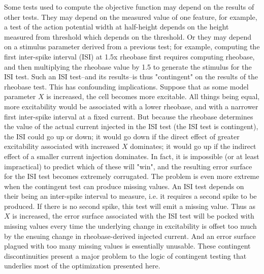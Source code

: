 Some tests used to compute the objective function may depend on the results of other tests.
They may depend on the measured value of one feature, for example, a test of the action potential width at half-height depends on the height measured from threshold which depends on the threshold.
Or they may depend on a stimulus parameter derived from a previous test; for example, computing the first inter-spike interval (ISI) at 1.5x rheobase first requires computing rheobase, and then multiplying the rheobase value by 1.5 to generate the stimulus for the ISI test.
Such an ISI test--and its results--is thus "contingent" on the results of the rheobase test.
This has confounding implications.
Suppose that as some model parameter $X$ is increased, the cell becomes more excitable.
All things being equal, more excitability would be associated with a lower rheobase, and with a narrower first inter-spike interval at a fixed current.
But because the rheobase determines the value of the actual current injected in the ISI test (the ISI test is contingent), the ISI could go up or down; it would go down if the direct effect of greater excitability associated with increased $X$ dominates; it would go up if the indirect effect of a smaller current injection dominates.
In fact, it is impossible (or at least impractical) to predict which of these will "win", and the resulting error surface for the ISI test becomes extremely corrugated.
The problem is even more extreme when the contingent test can produce missing values.
An ISI test depends on their being an inter-spike interval to measure, i.e. it requires a second spike to be produced.
If there is no second spike, this test will emit a missing value.
Thus as $X$ is increased, the error surface associated with the ISI test will be pocked with missing values every time the underlying change in excitability is offset too much by the ensuing change in rheobase-derived injected current.
And an error surface plagued with too many missing values is essentially unusable.
These contingent discontinuities present a major problem to the logic of contingent testing that underlies most of the optimization presented here.


